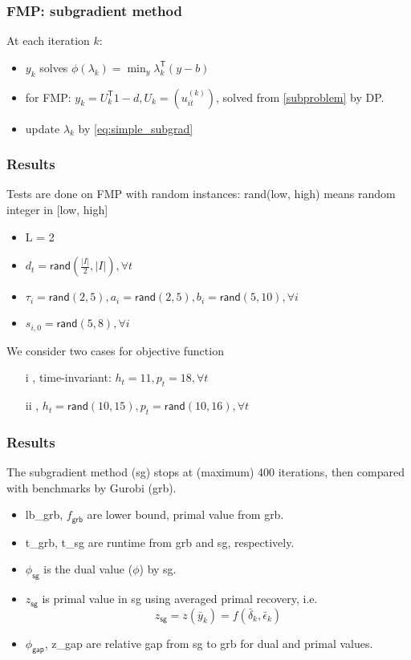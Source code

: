 \begin{frame}
  \frametitle{FMP: subgradient method}
  At each iteration \(k\):
  \begin{itemize}
    \item  \(y_k\) solves \(\phi(\lambda_k) = \min_y \lambda_k^\mathsf{T}(y-b)\)
    \item for FMP: \(y_k = U_k ^\mathsf{T} 1 - d, U_k = (u^{(k)}_{it})\), solved from \eqref{subproblem} by DP.
    \item update \(\lambda_k\) by \eqref{eq:simple_subgrad}
  \end{itemize}
\end{frame}
\begin{frame}
  \frametitle{Results}

  Tests are done on FMP with random instances: rand(low, high) means random integer in [low, high]

  \begin{itemize}
    \item L = 2
    \item \(d_t= \textsf{rand}(\frac{|I|}{2}, |I|), \forall t\)
    \item \(\tau_i = \textsf{rand}(2, 5), a_i =  \textsf{rand}(2, 5),  b_i =  \textsf{rand}(5, 10), \forall i\)
    \item \(s_{i, 0} = \textsf{rand}(5, 8), \forall i\)
  \end{itemize}

  We consider two cases for objective function
  \begin{itemize}
    \item [i], time-invariant: \(h_t = 11, p_t = 18, \forall t\)
    \item [ii], \(h_t = \textsf{rand}(10, 15), p_t = \textsf{rand}(10, 16), \forall t\)
  \end{itemize}
\end{frame}

\begin{frame}
  \frametitle{Results}

  The subgradient method (sg) stops at (maximum) 400 iterations, then compared with benchmarks by Gurobi (grb).
  \begin{itemize}
    \item lb\_grb, \(f_{\textsf{grb}}\)  are lower bound, primal value from grb.
    \item t\_grb, t\_sg are runtime from grb and sg, respectively.
    \item \(\phi_{\textsf{sg}}\) is the dual value (\(\phi\)) by sg.
    \item \(z_{\textsf{sg}}\) is primal value in sg using averaged primal recovery, i.e.
          \[z_{\textsf{sg}} = z(\bar y_k) = f(\bar \delta_k, \bar \epsilon_k)\]
    \item \(\phi_{\textsf{gap}}\), z\_gap are relative gap from sg to grb for dual and primal values.
  \end{itemize}
\end{frame}

